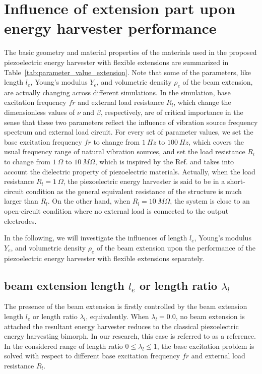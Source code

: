 \documentclass{elsarticle}
\begin{document}
\section{Influence of extension part upon energy harvester performance}


The basic geometry and material properties of the materials used in the proposed piezoelectric energy harvester with flexible extensions are summarized in Table~\ref{tab:parameter_value_extension}. Note that some of the parameters, like length $l_e$, Young's modulus $Y_e$, and volumetric density $\rho_e$ of the beam extension, are actually changing across different simulations. In the simulation, base excitation frequency $fr$ and external load resistance $R_l$, which change the dimensionless values of $\nu$ and $\beta$, respectively, are of critical importance in the sense that these two parameters reflect the influence of vibration source frequency spectrum and external load circuit. For every set of parameter values, we set the base excitation frequency $fr$ to change from $1\ Hz$ to $100\ Hz$, which covers the usual frequency range of natural vibration sources, and set the load resistance $R_l$ to change from $1\ \Omega$ to $10\ M\Omega$, which is inspired by the Ref. \cite{erturk2009experimentally} and takes into account the dielectric property of piezoelectric materials. Actually, when the load resistance $R_l = 1\ \Omega$, the piezoelectric energy harvester is said to be in a short-circuit condition as the general equivalent resistance of the structure is much larger than $R_l$. On the other hand, when $R_l = 10\ M\Omega$, the system is close to an open-circuit condition where no external load is connected to the output electrodes.

In the following, we will investigate the influences of length $l_e$, Young's modulus $Y_e$, and volumetric density $\rho_e$ of the beam extension upon the performance of the piezoelectric energy harvester with flexible extensions separately.

\subsection{beam extension length $l_e$ or length ratio $\lambda_l$}

The presence of the beam extension is firstly controlled by the beam extension length $l_e$ or length ratio $\lambda_l$, equivalently. When $\lambda_l = 0.0$, no beam extension is attached the resultant energy harvester reduces to the classical piezoelectric energy harvesting bimorph. \cite{erturk2009experimentally} In our research, this case is referred to as a reference. In the considered range of length ratio $0 \leq \lambda_l \leq 1$, the base excitation problem is solved with respect to different base excitation frequency $fr$ and external load resistance $R_l$. 
\end{document}
